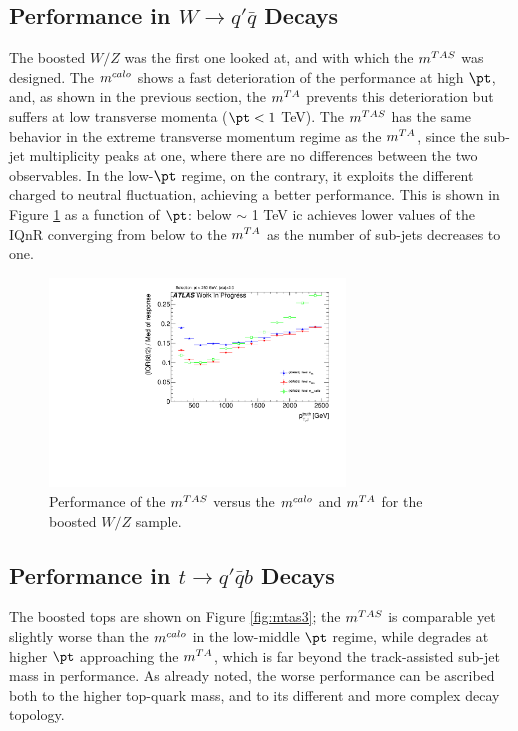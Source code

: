 \subsection{Performance in $W \to q'\bar{q}$ Decays}
The boosted $W/Z$ was the first one looked at, and with which the $\mtas$ was designed. The $m^{calo}$ shows a fast deterioration of the performance at high $\pt$, and, as shown in the previous section, the $m^{TA}$ prevents this deterioration but suffers at low transverse momenta ($\pt<1$ TeV).
The $\mtas$ has the same behavior in the extreme transverse momentum regime as the $m^{TA}$, since the sub-jet multiplicity peaks at one, where there are no differences between the two observables.
In the low-$\pt$ regime, on the contrary, it exploits the different charged to neutral fluctuation, achieving a better performance.
This is shown in Figure \ref{fig:mtas2} as a function of $\pt$: below $\sim$ 1 TeV ic achieves lower values of the IQnR converging from below to the $m^{TA}$ as the number of sub-jets decreases to one.

\begin{figure}[!ht]
  \centering
      \includegraphics[width=0.7\textwidth]{jet_part/mtas/71graphcftr_h_JetRatio_mJ12CALOIQRoMWZ.pdf}
  \caption[$\mtas$ for boosted $W/Z$]{Performance of the $\mtas$ versus the $m^{calo}$ and $m^{TA}$ for the boosted $W/Z$ sample.}
  \label{fig:mtas2}
\end{figure}

\subsection{Performance in $t\to q'\bar{q}b$ Decays}
The boosted tops are shown on Figure \ref{fig:mtas3}; the $\mtas$ is comparable yet slightly worse than the $m^{calo}$ in the low-middle $\pt$ regime, while degrades at higher $\pt$ approaching the $m^{TA}$, which is far beyond the track-assisted sub-jet mass in performance.
As already noted, the worse performance can be ascribed both to the higher top-quark mass, and to its different and more complex decay topology.


